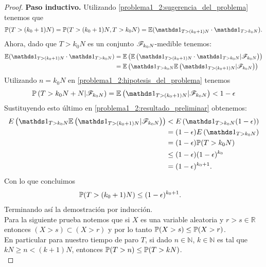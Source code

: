 \begin{proof}
	\textbf{Paso inductivo.} 
	Utilizando \eqref{problema1_2:sugerencia_del_problema} tenemos que
		\begin{align}
			\mw(T>(k_0+1)N) = \mw(T>(k_0+1)N, T>k_0N) = \E(\indic_{T>(k_0+1)N} \cdot \indic_{T>k_0N}).
		\end{align}
	Ahora, dado que $T>k_0N$ es un conjunto $\mathscr{F}_{k_0N}$-medible tenemos:
	\begin{align} 
		\E(\indic_{T>(k_0+1)N} \cdot \indic_{T>k_0N}) 	&=		\E\left(\E\left(\indic_{T>(k_0+1)N} \cdot \indic_{T>k_0N} | \F_{k_0N}\right)\right) \\ 
														&=		\E\left(\indic_{T>k_0N} \E\left(\indic_{T>(k_0+1)N}|\F_{k_0N}\right)\right) \label{problema1_2:resultado_preliminar}
	\end{align}
	Utilizando  $n=k_0N$ en \eqref{problema1_2:hipotesis_del_problema} tenemos
	\begin{align}
		\mw\left(T>k_0N+N|\F_{k_0N}\right) = \E\left(\indic_{T>(k_0+1)N}|\F_{k_0N}\right) < 1-\epsilon
	\end{align}
	Sustituyendo esto último en \eqref{problema1_2:resultado_preliminar} obtenemos:
		\begin{align}
				 E\left(\indic_{T>k_0N} \E\left(\indic_{T>(k_0+1)N}|\F_{k_0N}\right)\right) 	&< 		E\left(\indic_{T>k_0N} (1-\epsilon)\right) \\
																								&=	 	(1-\epsilon) E\left(\indic_{T>k_0N} \right) \\
																								&=		(1-\epsilon) \mw(T>k_0N) \\
																								&\leq   (1-\epsilon)(1-\epsilon)^{k_0} \\
																								&= (1-\epsilon)^{k_0 + 1}.
		\end{align}
	Con lo que concluimos
		\begin{align}
			\mathbb{P}(T>(k_0+1)N) &\leq (1-\epsilon)^{k_0 + 1}.
		\end{align}
	Terminando así la demostración por inducción.\\
	
	
	Para la siguiente prueba notemos que si $X$ es una variable aleatoria y $r > s \in \mathbb{R}$ entonces
	$(X > s) \subset (X > r)$ y por lo tanto $\mathbb{P}(X > s) \leq \mathbb{P}(X > r)$.\\
	
	En particular para nuestro tiempo de paro $T$, si dado $n \in \mathbb{N}$, $k \in \mathbb{N}$ es tal que 
	$kN \geq n < (k+1)N$, entonces $\mathbb{P}(T > n) \leq \mathbb{P}(T > kN)$.\\	


\end{proof}
